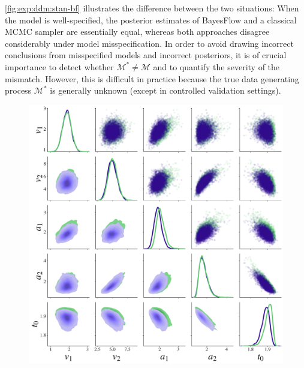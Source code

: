\documentclass[twoside,11pt]{article}
\newcommand{\0}{\boldsymbol{0}}
\begin{document}
\autoref{fig:exp:ddm:stan-bf} illustrates the difference between the two situations:
When the model is well-specified, the posterior estimates of BayesFlow and a classical MCMC sampler \citep[implemented in Stan;][]{Stan2022} are essentially equal, whereas both approaches disagree considerably under model misspecification.
In order to avoid drawing incorrect conclusions from misspecified models and incorrect posteriors, it is of crucial importance to detect whether $\mathcal{M}^*\ne\mathcal{M}$ and to quantify the severity of the mismatch.
However, this is difficult in practice because the true data generating process $\mathcal{M}^*$ is generally unknown (except in controlled validation settings).
\begin{figure}
\centering
    \begin{minipage}{.40\linewidth}
        \includegraphics[width=\linewidth]{abf_ddm_unbounded_pairplot_stan_bf_clean.pdf}
    \end{minipage}
    \hspace*{2cm}
    \begin{minipage}{.40\linewidth}

\end{minipage}
\end{figure}
\end{document}
